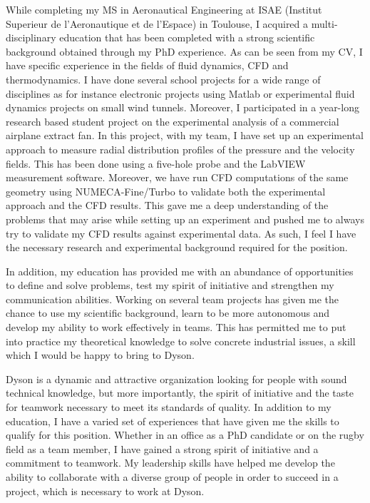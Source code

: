 \documentclass[10pt]{article}
\begin{document}
\noindent
While completing my MS in Aeronautical Engineering at ISAE (Institut Superieur de l’Aeronautique et de l’Espace) in Toulouse, I acquired a multi-disciplinary education that has been completed with a strong scientific background obtained through my PhD experience. As can be seen from my CV, I have specific experience in the fields of fluid dynamics, CFD and thermodynamics. I have done several school projects for a wide range of disciplines as for instance electronic projects using Matlab or experimental fluid dynamics projects on small wind tunnels. Moreover, I participated in  a year-long research based student project on the experimental analysis of a commercial airplane extract fan. In this project, with my team, I have set up an experimental approach to measure radial distribution profiles of the pressure and the velocity fields. This has been done using a five-hole probe and the LabVIEW measurement software. Moreover, we have run CFD computations of the same geometry using NUMECA-Fine/Turbo to validate both the experimental approach and the CFD results. This gave me a deep understanding of the problems that may arise while setting up an experiment and pushed me to always try to validate my CFD results against experimental data. As such, I feel I have the necessary research and experimental background required for the position.
\newline

\noindent
In addition, my education has provided me with an abundance of opportunities to define and solve problems, test my spirit of initiative and strengthen my communication abilities. Working on several team projects has given me the chance to use my scientific background, learn to be more autonomous and develop my ability to work effectively in teams. This has permitted me to put into practice my theoretical knowledge to solve concrete industrial issues, a skill which I would be happy to bring to Dyson.
\newline

\noindent
Dyson is a dynamic and attractive organization looking for people with sound technical knowledge, but more importantly, the spirit of initiative and the taste for teamwork necessary to meet its standards of quality. In addition to my education, I have a varied set of experiences that have given me the skills to qualify for this position. Whether in an office as a PhD candidate or on the rugby field as a team member, I have gained a strong spirit of initiative and a commitment to teamwork. My leadership skills have helped me develop the ability to collaborate with a diverse group of people in order to succeed in a project, which is necessary to work at Dyson.
\newline
\end{document}
